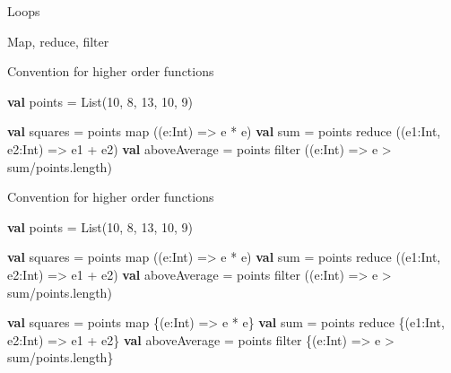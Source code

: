 \documentclass[ignorenonframetext,]{beamer}
\newenvironment{Shaded}{\begin{snugshade}}{\end{snugshade}}
\newcommand{\KeywordTok}[1]{\textcolor[rgb]{0.13,0.29,0.53}{\textbf{#1}}}
\newcommand{\DecValTok}[1]{\textcolor[rgb]{0.00,0.00,0.81}{#1}}
\newcommand{\FunctionTok}[1]{\textcolor[rgb]{0.00,0.00,0.00}{#1}}
\newcommand{\NormalTok}[1]{#1}
\begin{document}
\begin{frame}[fragile]{Loops}
\begin{block}{Map, reduce, filter}
\end{block}

\begin{block}{Convention for higher order functions}

\begin{Shaded}
\begin{Highlighting}[]
\KeywordTok{val}\NormalTok{ points = List(}\DecValTok{10}\NormalTok{, }\DecValTok{8}\NormalTok{, }\DecValTok{13}\NormalTok{, }\DecValTok{10}\NormalTok{, }\DecValTok{9}\NormalTok{)}
\end{Highlighting}
\end{Shaded}

\begin{Shaded}
\begin{Highlighting}[]
\KeywordTok{val}\NormalTok{ squares = points }\FunctionTok{map}\NormalTok{ ((e:Int) => e * e)}
\KeywordTok{val}\NormalTok{ sum = points }\FunctionTok{reduce}\NormalTok{ ((e1:Int, e2:Int) => e1 + e2)}
\KeywordTok{val}\NormalTok{ aboveAverage = points }\FunctionTok{filter}\NormalTok{ ((e:Int) => e > sum/points.}\FunctionTok{length}\NormalTok{)}
\end{Highlighting}
\end{Shaded}

\end{block}

\begin{block}{Convention for higher order functions}

\begin{Shaded}
\begin{Highlighting}[]
\KeywordTok{val}\NormalTok{ points = List(}\DecValTok{10}\NormalTok{, }\DecValTok{8}\NormalTok{, }\DecValTok{13}\NormalTok{, }\DecValTok{10}\NormalTok{, }\DecValTok{9}\NormalTok{)}
\end{Highlighting}
\end{Shaded}

\begin{Shaded}
\begin{Highlighting}[]
\KeywordTok{val}\NormalTok{ squares = points }\FunctionTok{map}\NormalTok{ ((e:Int) => e * e)}
\KeywordTok{val}\NormalTok{ sum = points }\FunctionTok{reduce}\NormalTok{ ((e1:Int, e2:Int) => e1 + e2)}
\KeywordTok{val}\NormalTok{ aboveAverage = points }\FunctionTok{filter}\NormalTok{ ((e:Int) => e > sum/points.}\FunctionTok{length}\NormalTok{)}
\end{Highlighting}
\end{Shaded}

\begin{Shaded}
\begin{Highlighting}[]
\KeywordTok{val}\NormalTok{ squares = points map \{(e:Int) => e * e\}}
\KeywordTok{val}\NormalTok{ sum = points reduce \{(e1:Int, e2:Int) => e1 + e2\}}
\KeywordTok{val}\NormalTok{ aboveAverage = points filter \{(e:Int) => e > sum/points.}\FunctionTok{length}\NormalTok{\}}
\end{Highlighting}
\end{Shaded}


\end{block}
\end{frame}
\end{document}
